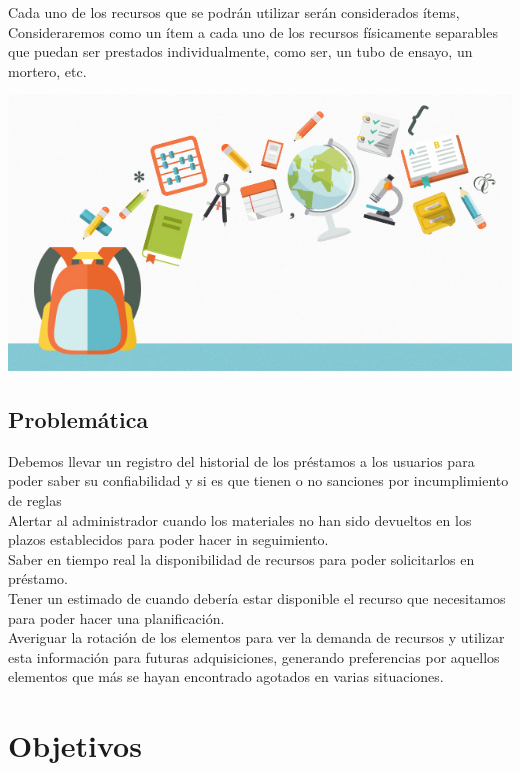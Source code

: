 \documentclass[12pt]{article}
\begin{document}
Cada uno de los recursos que se podrán utilizar serán considerados ítems,  Consideraremos como un ítem a cada uno de los recursos  físicamente separables que puedan ser prestados individualmente, como ser, un tubo de ensayo, un mortero, etc.  
\begin{center}

\includegraphics[scale=0.4]{IMG/recursos.jpg} \\ 

\end{center}



\subsection{Problemática}
Debemos llevar un registro del historial de los préstamos a los usuarios para poder saber su confiabilidad y si es que tienen o no sanciones por incumplimiento de reglas \\
Alertar al administrador cuando los materiales no han sido devueltos en los plazos establecidos para poder hacer in seguimiento. \\
Saber en tiempo real la disponibilidad de recursos para poder solicitarlos en préstamo.  \\
Tener un estimado de cuando debería estar disponible el recurso que necesitamos para poder hacer una planificación. \\
Averiguar la rotación de los elementos para ver la demanda de recursos  y utilizar esta información para futuras adquisiciones, generando preferencias por aquellos elementos que más se hayan encontrado agotados en varias situaciones. 

\section{Objetivos}
\end{document}
